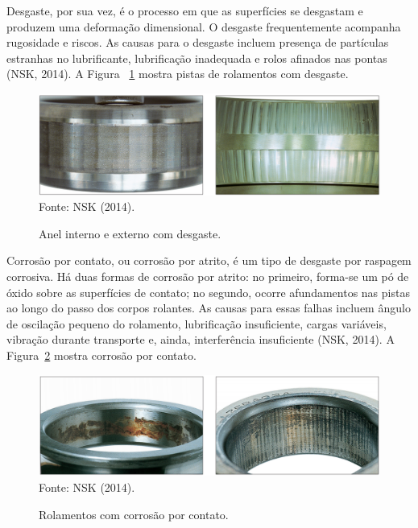 \documentclass[
	12pt,				
	oneside,			
	a4paper,			
	english,			
	brazil,			
	]{abntex2ppgsi}
\begin{document}
Desgaste, por sua vez, é o processo em que as superfícies se desgastam e produzem uma deformação dimensional. O desgaste frequentemente acompanha rugosidade e riscos. As causas para o desgaste incluem presença de partículas estranhas no lubrificante, lubrificação inadequada e rolos afinados nas pontas (NSK, 2014). A Figura ~\ref{desgaste_nsk} mostra pistas de rolamentos com desgaste.

\begin{figure}[H]
\centering
\caption {Anel interno e externo com desgaste.}
\includegraphics[width=\textwidth,height=\textheight,keepaspectratio]{desgaste_nsk} \\
Fonte: NSK (2014).
\label{desgaste_nsk}
\end{figure}

Corrosão por contato, ou corrosão por atrito, é um tipo de desgaste por raspagem corrosiva. Há duas formas de corrosão por atrito: no primeiro, forma-se um pó de óxido sobre as superfícies de contato; no segundo, ocorre afundamentos nas pistas ao longo do passo dos corpos rolantes. As causas para essas falhas incluem ângulo de oscilação pequeno do rolamento, lubrificação insuficiente, cargas variáveis, vibração durante transporte e, ainda, interferência insuficiente (NSK, 2014). A Figura~\ref{corrosao_nsk} mostra corrosão por contato.

\begin{figure}[H]
\centering
\caption {Rolamentos com corrosão por contato.}
\includegraphics[width=\textwidth,height=\textheight,keepaspectratio]{corrosao_nsk} \\
Fonte: NSK (2014).
\label{corrosao_nsk}
\end{figure}
\end{document}
